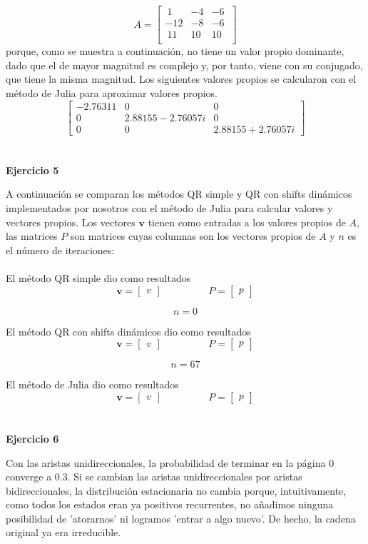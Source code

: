 \documentclass[11pt]{article}
\begin{document}
$$
A =
\begin{bmatrix}
 \ 1 & -4 & -6 \ \\
-12 & -8 & -6 \ \\
 \ 11 & 10 & 10 \ \\
\end{bmatrix}
$$
porque, como se muestra a continuación, no tiene un valor propio dominante, dado que el de mayor magnitud es complejo y, por tanto, viene con su conjugado, que tiene la misma magnitud. Los siguientes valores propios se calcularon con el método de Julia para aproximar valores propios.
$$
\begin{bmatrix}
 -2.76311 & 0 & 0 \\
 0 & 2.88155-2.76057i & 0 \\
 0 & 0 & 2.88155+2.76057i
\end{bmatrix}
$$
\\
\\

\noindent
\textbf{Ejercicio 5}


\noindent
A continuación se comparan los métodos QR simple y QR con shifts dinámicos implementados por nosotros con el método de Julia para calcular valores y vectores propios. Los vectores $\textbf{v}$ tienen como entradas a los valores propios de $A$, las matrices $P$ son matrices cuyas columnas son los vectores propios de $A$ y $n$ es el número de iteraciones:
\\
\\

El método QR simple dio como resultados
\[
 \textbf{v} =
 \begin{bmatrix}
v
\end{bmatrix}
 \qquad\text{ }\qquad
P =
 \begin{bmatrix}
p
\end{bmatrix}
 \]

 $$n = 0$$

El método QR con shifts dinámicos dio como resultados
\[
 \textbf{v} =
 \begin{bmatrix}
v
\end{bmatrix}
 \qquad\text{ }\qquad
P =
 \begin{bmatrix}
p
\end{bmatrix}
 \]

 $$n = 67$$

El método de Julia dio como resultados
\[
 \textbf{v} =
 \begin{bmatrix}
v
\end{bmatrix}
 \qquad\text{ }\qquad
P =
 \begin{bmatrix}
p
\end{bmatrix}
 \]
\\
\\

\noindent
\textbf{Ejercicio 6}

\noindent
Con las aristas unidireccionales, la probabilidad de terminar en la página 0 converge a 0.3. Si se cambian las aristas unidireccionales por aristas bidireccionales, la distribución estacionaria no cambia porque, intuitivamente, como todos
los estados eran ya positivos recurrentes, no añadimos ninguna posibilidad
de 'atorarnos' ni logramos 'entrar a algo nuevo'. De hecho, la cadena
original ya era irreducible.


\noindent
\end{document}
